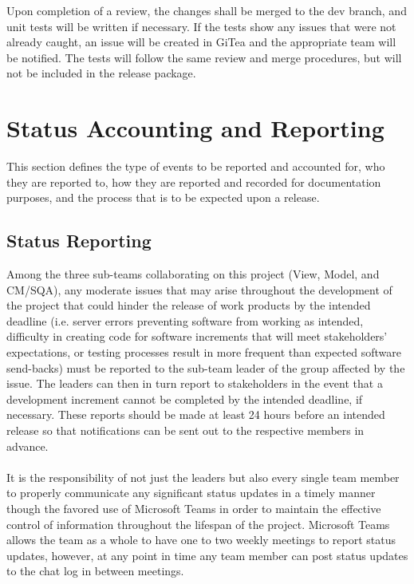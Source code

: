 \documentclass[letterpaper,12pt,oneside,listof=totoc]{scrreprt}
\begin{document}
Upon completion of a review, the changes shall be merged to the dev branch, and unit tests will be written if necessary. If the tests show any issues that were not already caught, an issue will be created in GiTea and the appropriate team will be notified. The tests will follow the same review and merge procedures, but will not be included in the release package.

\section{Status Accounting and Reporting}
This section defines the type of events to be reported and accounted for, who they are reported to, how they are reported and recorded for documentation purposes, and the process that is to be expected upon a release.

\subsection{Status Reporting}


Among the three sub-teams collaborating on this project (View, Model, and CM/SQA), any moderate issues that may arise throughout the development of the project that could hinder the release of work products by the intended deadline (i.e. server errors preventing software from working as intended, difficulty in creating code for software increments that will meet stakeholders' expectations, or testing processes result in more frequent than expected software send-backs) must be reported to the sub-team leader of the group affected by the issue. %
The leaders can then in turn report to stakeholders in the event that a development increment cannot be completed by the intended deadline, if necessary. These reports should be made at least 24 hours before an intended release so that notifications can be sent out to the respective members in advance.\\
\\
It is the responsibility of not just the leaders but also every single team member to properly communicate any significant status updates in a timely manner though the favored use of Microsoft Teams in order to maintain the effective control of information throughout the lifespan of the project. Microsoft Teams allows the team as a whole to have one to two weekly meetings to report status updates, however, at any point in time any team member can post status updates to the chat log in between meetings.
\end{document}
